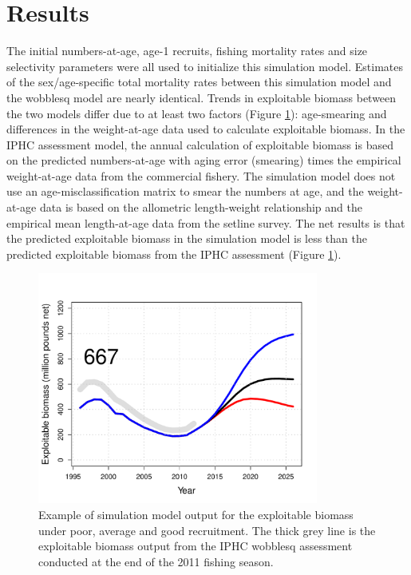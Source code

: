 
\section{Results} %
\label{sec:results}

The initial numbers-at-age, age-1 recruits, fishing mortality rates and size selectivity parameters were all used to initialize this simulation model.  Estimates of the sex/age-specific total mortality rates between this simulation model and the wobblesq model are nearly identical.  Trends in exploitable biomass between the two models differ due to at least two factors (Figure \ref{fig:FIGURES_EBioDemo}): age-smearing and differences in the weight-at-age data used to calculate exploitable biomass.  In the IPHC assessment model, the annual calculation of exploitable biomass is based on the predicted numbers-at-age with aging error (smearing) times the empirical weight-at-age data from the commercial fishery.  The simulation model does not use an age-misclassification matrix to smear the numbers at age, and the weight-at-age data is based on the allometric length-weight relationship and the empirical mean length-at-age data from the setline survey.  The net results is that the predicted exploitable biomass in the simulation model is less than the predicted exploitable biomass from the IPHC assessment (Figure \ref{fig:FIGURES_EBioDemo}).

\begin{figure}[htbp]
	\centering
		\includegraphics[height=3in]{../FIGURES/EBioDemo.pdf}
	\caption{Example of simulation model output for the exploitable biomass under poor, average and good recruitment. The thick grey line is the exploitable biomass output from the IPHC wobblesq assessment conducted at the end of the 2011 fishing season. }
	\label{fig:FIGURES_EBioDemo}
\end{figure}

